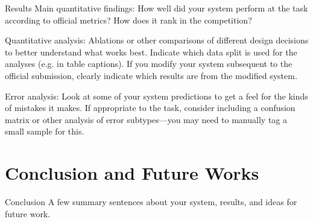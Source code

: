 \documentclass{llncs}
\begin{document}
Results
Main quantitative findings: How well did your system perform at the task according to official metrics? How does it rank in the competition?

Quantitative analysis: Ablations or other comparisons of different design decisions to better understand what works best. Indicate which data split is used for the analyses (e.g. in table captions). If you modify your system subsequent to the official submission, clearly indicate which results are from the modified system.

Error analysis: Look at some of your system predictions to get a feel for the kinds of mistakes it makes. If appropriate to the task, consider including a confusion matrix or other analysis of error subtypes—you may need to manually tag a small sample for this.

\section{Conclusion and Future Works}


Conclusion
A few summary sentences about your system, results, and ideas for future work.




\begin{raggedright}

\end{raggedright}
\end{document}
